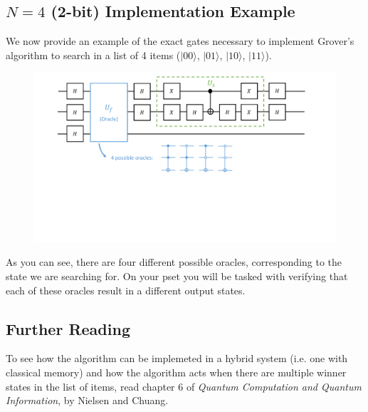 \documentclass[11pt]{article} %
\begin{document}
\subsection{$N=4$ (2-bit) Implementation Example}
We now provide an example of the exact gates necessary to implement Grover's algorithm to search in a list of 4 items ($|00\rangle$, $|01\rangle$, $|10\rangle$, $|11\rangle$).
\begin{figure}[h!]
    \centering
    \includegraphics[width=.97\textwidth]{Lecture7Figs/gcircex.pdf}
    \label{fig:search_item}
\end{figure}
\newline
As you can see, there are four different possible oracles, corresponding to the state we are searching for. On your pset you will be tasked with verifying that each of these oracles result in a different output states.

\subsection{Further Reading}
To see how the algorithm can be implemeted in a hybrid system (i.e. one with classical memory) and how the algorithm acts when there are multiple winner states in the list of items, read chapter 6 of \textit{Quantum Computation and Quantum Information}, by Nielsen and Chuang.
\end{document}
